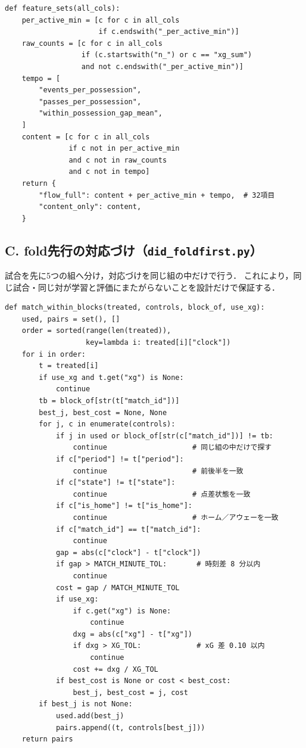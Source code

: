 \begin{verbatim}
def feature_sets(all_cols):
    per_active_min = [c for c in all_cols
                      if c.endswith("_per_active_min")]
    raw_counts = [c for c in all_cols
                  if (c.startswith("n_") or c == "xg_sum")
                  and not c.endswith("_per_active_min")]
    tempo = [
        "events_per_possession",
        "passes_per_possession",
        "within_possession_gap_mean",
    ]
    content = [c for c in all_cols
               if c not in per_active_min
               and c not in raw_counts
               and c not in tempo]
    return {
        "flow_full": content + per_active_min + tempo,  # 32項目
        "content_only": content,
    }
\end{verbatim}

\subsection*{C. fold先行の対応づけ（\texttt{did\_foldfirst.py}）}

試合を先に5つの組へ分け，対応づけを同じ組の中だけで行う．
これにより，同じ試合・同じ対が学習と評価にまたがらないことを設計だけで保証する．

\begin{verbatim}
def match_within_blocks(treated, controls, block_of, use_xg):
    used, pairs = set(), []
    order = sorted(range(len(treated)),
                   key=lambda i: treated[i]["clock"])
    for i in order:
        t = treated[i]
        if use_xg and t.get("xg") is None:
            continue
        tb = block_of[str(t["match_id"])]
        best_j, best_cost = None, None
        for j, c in enumerate(controls):
            if j in used or block_of[str(c["match_id"])] != tb:
                continue                    # 同じ組の中だけで探す
            if c["period"] != t["period"]:
                continue                    # 前後半を一致
            if c["state"] != t["state"]:
                continue                    # 点差状態を一致
            if c["is_home"] != t["is_home"]:
                continue                    # ホーム／アウェーを一致
            if c["match_id"] == t["match_id"]:
                continue
            gap = abs(c["clock"] - t["clock"])
            if gap > MATCH_MINUTE_TOL:       # 時刻差 8 分以内
                continue
            cost = gap / MATCH_MINUTE_TOL
            if use_xg:
                if c.get("xg") is None:
                    continue
                dxg = abs(c["xg"] - t["xg"])
                if dxg > XG_TOL:             # xG 差 0.10 以内
                    continue
                cost += dxg / XG_TOL
            if best_cost is None or cost < best_cost:
                best_j, best_cost = j, cost
        if best_j is not None:
            used.add(best_j)
            pairs.append((t, controls[best_j]))
    return pairs
\end{verbatim}

